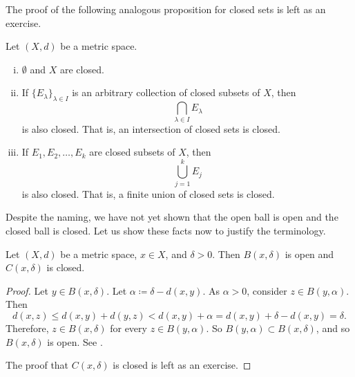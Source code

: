 The proof of the following analogous proposition for closed sets
is left as an exercise.

\begin{prop} \label{prop:topology:closed}
\pagebreak[2]
Let $(X,d)$ be a metric space.
\begin{enumerate}[(i)]
\item \label{topology:closedi} $\emptyset$ and $X$ are closed.
\item \label{topology:closedii} If $\{ E_\lambda \}_{\lambda \in I}$ is
an arbitrary collection of closed subsets of $X$, then
\begin{equation*}
\bigcap_{\lambda \in I} E_\lambda
\end{equation*}
is also closed.  That is, an intersection of closed sets is closed.
\item \label{topology:closediii} If $E_1, E_2, \ldots, E_k$ are closed
subsets of $X$, then
\begin{equation*}
\bigcup_{j=1}^k E_j
\end{equation*}
is also closed.  That is, a finite union of closed sets is closed.
\end{enumerate}
\end{prop}

Despite the naming,
we have not yet shown that the open ball is open and the closed ball is
closed.  Let us show these facts now to justify the terminology.

\begin{prop} \label{prop:topology:ballsopenclosed}
Let $(X,d)$ be a metric space, $x \in X$, and $\delta > 0$.  Then
$B(x,\delta)$ is open and 
$C(x,\delta)$ is closed.
\end{prop}

\begin{proof}
Let $y \in B(x,\delta)$.  Let $\alpha \coloneqq \delta-d(x,y)$.  As $\alpha
> 0$, consider $z \in B(y,\alpha)$.  Then
\begin{equation*}
d(x,z) \leq d(x,y) + d(y,z) < d(x,y) + \alpha = d(x,y) + \delta-d(x,y) =
\delta .
\end{equation*}
Therefore, $z \in B(x,\delta)$ for every $z \in B(y,\alpha)$.  So
$B(y,\alpha) \subset B(x,\delta)$, and so
$B(x,\delta)$ is open.  See .

\begin{myfigureht}
\caption{Proof that $B(x,\delta)$ is open: $B(y,\alpha) \subset
B(x,\delta)$ with the triangle inequality illustrated.\label{fig:ballisopen}}
\end{myfigureht}

The proof that $C(x,\delta)$ is closed is left as an exercise.
\end{proof}

